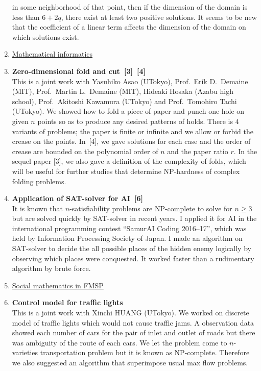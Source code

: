 \documentclass[a4j,twocolumn]{jarticle}
\begin{document}
\begin{enumerate}
       in some neighborhood of that point, then
       if the dimension of the domain is less than $6 + 2q$,
       there exist at least two positive solutions.
       It seems to be new that the coefficient of a linear term affects
       the dimension of the domain on which solutions exist.
 \item[] \underline{Mathematical informatics}
 \item {\bf Zero-dimensional fold and cut~[3]~[4]} \\
       This is a joint work with
       Yasuhiko Asao (UTokyo), Prof.~Erik D.~Demaine (MIT),
       Prof.~Martin L.~Demaine (MIT), Hideaki Hosaka (Azabu high school),
       Prof.~Akitoshi Kawamura (UTokyo)
       and Prof.~Tomohiro Tachi (UTokyo).
       We showed how to fold a piece of paper and punch one hole
       on given $n$ points
       so as to produce any desired patterns of holds.
       There is $4$ variants of problems;
       the paper is finite or infinite
       and we allow or forbid the crease on the points.
       In~[4], we gave solutions for each case and the order of crease
       are bounded on the polynomial order of $n$ and the paper ratio
       $r$.
       In the sequel paper [3], we also gave a definition of
       the complexity of folds, which
       will be useful for further studies that determine
       NP-hardness of complex folding problems.
 \item {\bf Application of SAT-solver for AI~[6]} \\
       It is known that $n$-satisfiability problems are NP-complete
       to solve for $n \geq 3$
       but are solved quickly by SAT-solver in recent years.
       I applied it for AI in the international
       programming contest ``SamurAI Coding
       2016--17'', which was held by Information
       Processing Society of Japan. I made an algorithm on SAT-solver
       to decide the all possible places of the hidden enemy logically
       by observing which places were conquested.
       It worked faster than a rudimentary algorithm by brute force.
 \item[] \underline{Social mathematics in FMSP}
 \item {\bf Control model for traffic lights} \\
       This is a joint work with Xinchi HUANG (UTokyo).
       We worked on discrete model of traffic lights which would not
       cause traffic jams.
       A observation data showed each number of cars for the pair of
       inlet and outlet of roads but there was ambiguity of
       the route of each cars.
       We let the problem come to
       $n$-varieties transportation problem but it is known as
       NP-complete. Therefore we also suggested an algorithm
       that superimpose usual max flow problems.
\end{enumerate}
\end{document}
